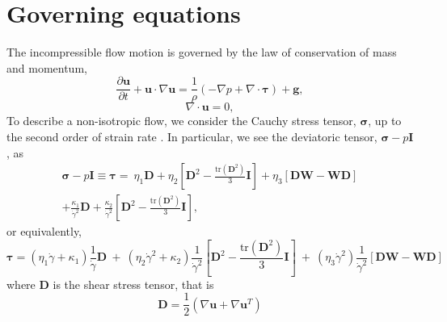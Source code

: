 \section{Governing equations}
The incompressible flow motion is governed by the law of conservation of mass and momentum,
\begin{equation}
  \frac{\partial {\bm u}}{\partial t} 
  + {\bm u} \cdot \nabla {\bm u} = \frac{1}{\rho}
  \left( 
    -\nabla p + \nabla \cdot {\bm {\bm \tau}}\right) + {\bm g},
  \label{eq_momentum}
\end{equation}
\begin{equation}
  \nabla \cdot {\bm u} = 0,
  \label{eq_mass}
\end{equation}
To describe a non-isotropic flow, we consider the Cauchy stress tensor, ${\bm \sigma}$, up to the second order of strain rate \cite{srivastava_viscometric_2021}. In particular, we see the deviatoric tensor, ${\bm \sigma} - p {\bm I}$, as 
\begin{align*}
{\bm \sigma} - p {\bm I} \equiv
  {\bm {\bm \tau}}
  =  \ \eta_1 {\bm D} 
  + \eta_2  \left[ {\bm D}^2  - \frac{\text{tr}\left({\bm D}^2\right)}{3}{\bm I} \right]
  + \eta_3  \left[ {\bm D}{\bm W} - {\bm W}{\bm D} \right]
  \nonumber \\
  + \frac{\kappa_1}{\dot{\gamma }^2} \bm D 
  + \frac{\kappa_2}{\dot{\gamma }^2}  \left[ {\bm D}^2  
  - \frac{\text{tr}\left({\bm D}^2\right)}{3}{\bm I} \right],
\end{align*}
or equivalently, 
\begin{equation}
  {\bm {\bm \tau}}
  = \left( \eta_1 \dot{\gamma}+ \kappa_1 \right) \frac{1}{\dot{\gamma}} {\bm D}
  \ +  \ 
  \left( \eta_2  \dot{\gamma}^2
  +  \kappa_2 
  \right) \frac{1}{\dot{\gamma}^2}
  \left[ {\bm D}^2  - \frac{\text{tr}\left({\bm D}^2\right)}{3}{\bm I} \right]
  \ + \
  \left( \eta_3 \dot{\gamma}^2 \right)
  \frac{1}{\dot{\gamma}^2}
    \left[ {\bm D}{\bm W} - {\bm W}{\bm D} \right]
\label{eq_2ndOrder_tau}
\end{equation}
where ${\bm D} $ is the shear stress tensor, that is
\[
	{\bm D} = \frac{1}{2}\left( \nabla {\bm u} + \nabla {\bm u}^{T}\right)	
\]

